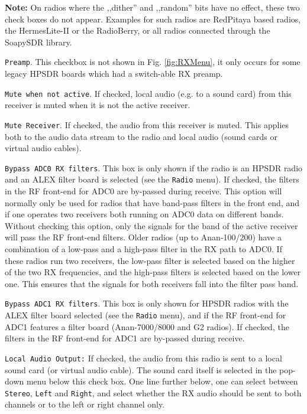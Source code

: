 \documentclass[12pt]{book}
\def\rett#1{\texttt{\color{red}#1}}
\def\bltt#1{\texttt{\color{blue}#1}}
\begin{document}
\textbf{Note:} On radios where the ,,dither'' and ,,random'' bits have no effect, these
two check boxes do not appear. Examples for such radios are RedPitaya based radios,
the HermesLite-II or the RadioBerry, or all radios connected through the SoapySDR
library.

\rett{Preamp}. This checkbox is not shown in Fig. \ref{fig:RXMenu}, it only occurs
for some legacy HPSDR boards which had a switch-able RX preamp.

\rett{Mute when not active}. If checked, local audio (e.g. to a sound card)
from this receiver is muted when
it is not the active receiver.

\rett{Mute Receiver}. If checked, the audio from this receiver is muted.
This applies both to the audio data stream to the radio and local audio
(sound cards or virtual  audio cables).

\rett{Bypass ADC0 RX filters}. This box is only shown if the radio is an HPSDR radio
and an ALEX filter board
is selected (see the \bltt{Radio} menu). If checked, the filters in the RF front-end for ADC0
are by-passed during receive. This option will normally only be used for radios that
have band-pass filters in the front end, and if one operates two receivers both running
on ADC0 data on different bands. Without checking this option, only the signals for
the band of the active receiver will pass the RF front-end filters.
Older radios (up to Anan-100/200)  have a
combination of a low-pass and a high-pass filter in the RX path to ADC0. If these
radios run two receivers, the low-pass filter is selected based on the higher
of the two RX frequencies, and the high-pass filters is selected based on the
lower one. This ensures that the signals for both receivers fall into  the filter
pass band.

\rett{Bypass ADC1 RX filters}. This box is only shown for HPSDR radios with the ALEX filter board
selected (see the \bltt{Radio} menu), and if the RF front-end for ADC1
features a filter board (Anan-7000/8000 and G2 radios).
If checked, the filters in the RF front-end for ADC1
are by-passed during receive.

\rett{Local Audio Output:} If checked, the audio from this radio is sent to a local
sound card (or virtual audio cable). The sound card itself is selected in the
pop-down menu below this check box. One line further below, one can select between
\texttt{Stereo}, \texttt{Left} and \texttt{Right}, and select whether the RX
audio should be sent to both channels or to the left or right channel only.
\end{document}
